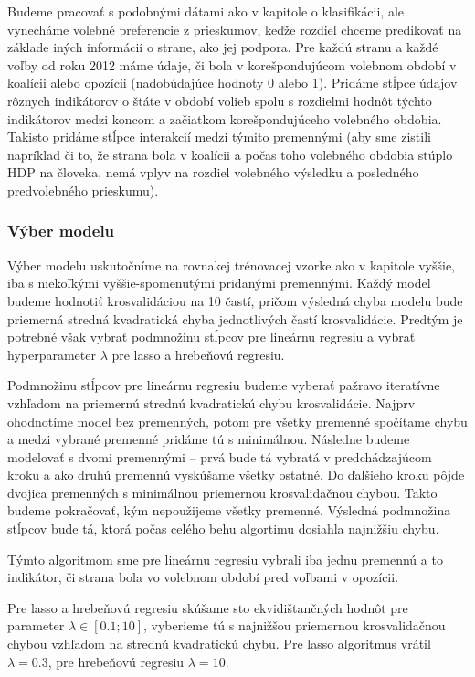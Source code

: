 \documentclass[report.tex]{subfiles}
\begin{document}
Budeme pracovať s podobnými dátami ako v kapitole o klasifikácii, ale vynecháme volebné preferencie z prieskumov, keďže rozdiel chceme predikovať na základe iných informácií o strane, ako jej podpora. Pre každú stranu a každé voľby od roku 2012 máme údaje, či bola v korešpondujúcom volebnom období v koalícii alebo opozícii (nadobúdajúce hodnoty 0 alebo 1). Pridáme stĺpce údajov rôznych indikátorov o štáte v období volieb spolu s rozdielmi hodnôt týchto indikátorov medzi koncom a začiatkom korešpondujúceho volebného obdobia. Takisto pridáme stĺpce interakcií medzi týmito premennými (aby sme zistili napríklad či to, že strana bola v koalícii a počas toho volebného obdobia stúplo HDP na človeka, nemá vplyv na rozdiel volebného výsledku a posledného predvolebného prieskumu).

\subsubsection{Výber modelu}

Výber modelu uskutočníme na rovnakej trénovacej vzorke ako v kapitole vyššie, iba s niekoľkými vyššie-spomenutými pridanými premennými. Každý model budeme hodnotiť krosvalidáciou na 10 častí, pričom výsledná chyba modelu bude priemerná stredná kvadratická chyba jednotlivých častí krosvalidácie. Predtým je potrebné však vybrať podmnožinu stĺpcov pre lineárnu regresiu a vybrať hyperparameter $\lambda$ pre lasso a hrebeňovú regresiu. 

Podmnožinu stĺpcov pre lineárnu regresiu budeme vyberať pažravo iteratívne vzhľadom na priemernú strednú kvadratickú chybu krosvalidácie. Najprv ohodnotíme model bez premenných, potom pre všetky premenné spočítame chybu a medzi vybrané premenné pridáme tú s minimálnou. Následne budeme modelovať s dvomi premennými -- prvá bude tá vybratá v predchádzajúcom kroku a ako druhú premennú vyskúšame všetky ostatné. Do ďalšieho kroku pôjde dvojica premenných s minimálnou priemernou krosvalidačnou chybou. Takto budeme pokračovať, kým nepoužijeme všetky premenné. Výsledná podmnožina stĺpcov bude tá, ktorá počas celého behu algortimu dosiahla najnižšiu chybu. 

Týmto algoritmom sme pre lineárnu regresiu vybrali iba jednu premennú a to indikátor, či strana bola vo volebnom období pred voľbami v opozícii. 

Pre lasso a hrebeňovú regresiu skúšame sto ekvidištančných hodnôt pre parameter $\lambda \in [0.1; 10]$, vyberieme tú s najnižšou priemernou krosvalidačnou chybou vzhľadom na strednú kvadratickú chybu. Pre lasso algoritmus vrátil $\lambda=0.3$, pre hrebeňovú regresiu $\lambda = 10$. 
\end{document}

